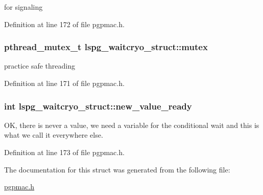 for signaling 



Definition at line 172 of file pgpmac.\-h.

\hypertarget{structlspg__waitcryo__struct_a62b50ead380fc8a6be35956eba384ba6}{
\subsubsection[{mutex}]{\setlength{\rightskip}{0pt plus 5cm}pthread\-\_\-mutex\-\_\-t lspg\-\_\-waitcryo\-\_\-struct\-::mutex}}\label{structlspg__waitcryo__struct_a62b50ead380fc8a6be35956eba384ba6}


practice safe threading 



Definition at line 171 of file pgpmac.\-h.

\hypertarget{structlspg__waitcryo__struct_a97298b773fd8c1f2ef20159093a08246}{
\subsubsection[{new\-\_\-value\-\_\-ready}]{\setlength{\rightskip}{0pt plus 5cm}int lspg\-\_\-waitcryo\-\_\-struct\-::new\-\_\-value\-\_\-ready}}\label{structlspg__waitcryo__struct_a97298b773fd8c1f2ef20159093a08246}


O\-K, there is never a value, we need a variable for the conditional wait and this is what we call it everywhere else. 



Definition at line 173 of file pgpmac.\-h.



The documentation for this struct was generated from the following file\-:\begin{DoxyCompactItemize}
\item 
\hyperlink{pgpmac_8h}{pgpmac.\-h}\end{DoxyCompactItemize}
